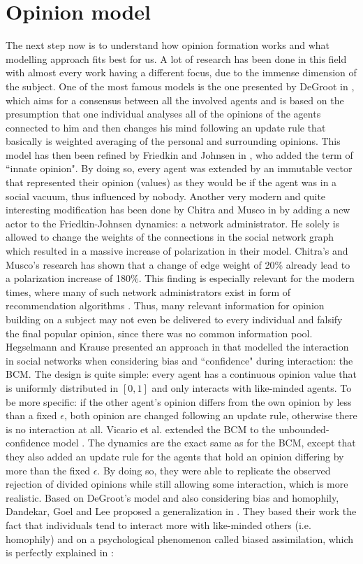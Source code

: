 \documentclass[12pt,a4paper,twoside]{article}
\begin{document}
\section{Opinion model}
The next step now is to understand how opinion formation works and what modelling approach fits best for us. A lot of research has been done in this field with almost every work having a different focus, due to the immense dimension of the subject. One of the most famous models is the one presented by DeGroot in \cite{Degroot1974}, which aims for a consensus between all the involved agents and is based on the presumption that one individual analyses all of the opinions of the agents connected to him and then changes his mind following an update rule that basically is weighted averaging of the personal and surrounding opinions. This model has then been refined by Friedkin and Johnsen in \cite{Friedkin1990}, who added the term of ``innate opinion". By doing so, every agent was extended by an immutable vector that represented their opinion (values) as they would be if the agent was in a social vacuum, thus influenced by nobody. Another very modern and quite interesting modification has been done by Chitra and Musco in \cite{Chitra2019} by adding a new actor to the Friedkin-Johnsen dynamics: a network administrator. He solely is allowed to change the weights of the connections in the social network graph which resulted in a massive increase of polarization in their model. Chitra's and Musco's research has shown that a change of edge weight of 20\% already lead to a polarization increase of 180\%. This finding is especially relevant for the modern times, where many of such network administrators exist in form of recommendation algorithms \cite{Pariser2011}. Thus, many relevant information for opinion building on a subject may not even be delivered to every individual and falsify the final popular opinion, since there was no common information pool. Hegselmann and Krause presented an approach in \cite{Hegselmann2002} that modelled the interaction in social networks when considering bias and ``confidence" during interaction: the \ac{BCM}. The design is quite simple: every agent has a continuous opinion value that is uniformly distributed in $\left[0, 1\right]$ and only interacts with like-minded agents. To be more specific: if the other agent's opinion differs from the own opinion by less than a fixed $\epsilon$, both opinion are changed following an update rule, otherwise there is no interaction at all. Vicario et al. extended the \ac{BCM} to the unbounded-confidence model \cite{Vicario2016}. The dynamics are the exact same as for the \ac{BCM}, except that they also added an update rule for the agents that hold an opinion differing by more than the fixed $\epsilon$. By doing so, they were able to replicate the observed rejection of divided opinions while still allowing some interaction, which is more realistic. Based on DeGroot's model and also considering bias and homophily, Dandekar, Goel and Lee proposed a generalization in \cite{Dandekar2013}. They based their work the fact that individuals tend to interact more with like-minded others (i.e. homophily) and on a psychological phenomenon called biased assimilation, which is perfectly explained in \cite{Lord2009}: 
\end{document}
